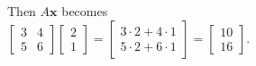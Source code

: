 \documentclass[preview]{standalone}
\begin{document}
\begin{center}
Then $A\mathbf{x}$ becomes \\ $\begin{bmatrix} 3 & 4 \\ 5 & 6 \end{bmatrix} \begin{bmatrix} 2 \\ 1 \end{bmatrix} = \begin{bmatrix} 3\cdot 2 + 4\cdot 1 \\ 5\cdot 2 + 6\cdot 1\end{bmatrix} = \begin{bmatrix} 10 \\ 16 \end{bmatrix}.$
\end{center}
\end{document}

